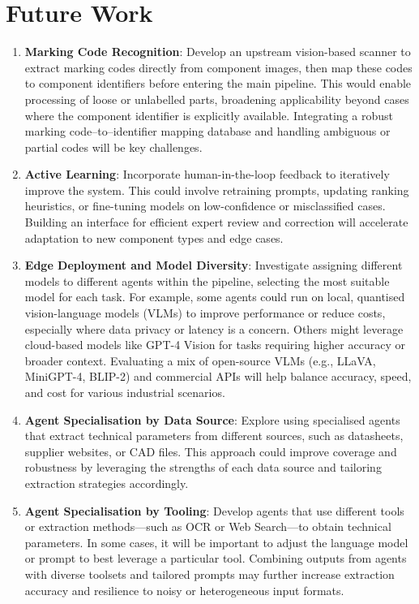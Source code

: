 \section{Future Work}
\begin{enumerate}
  \item \textbf{Marking Code Recognition}: Develop an upstream vision-based scanner to extract marking codes directly from component images, then map these codes to component identifiers before entering the main pipeline. This would enable processing of loose or unlabelled parts, broadening applicability beyond cases where the component identifier is explicitly available. Integrating a robust marking code–to–identifier mapping database and handling ambiguous or partial codes will be key challenges.
  \item \textbf{Active Learning}: Incorporate human-in-the-loop feedback to iteratively improve the system. This could involve retraining prompts, updating ranking heuristics, or fine-tuning models on low-confidence or misclassified cases. Building an interface for efficient expert review and correction will accelerate adaptation to new component types and edge cases.
  \item \textbf{Edge Deployment and Model Diversity}: Investigate assigning different models to different agents within the pipeline, selecting the most suitable model for each task. For example, some agents could run on local, quantised vision-language models (VLMs) to improve performance or reduce costs, especially where data privacy or latency is a concern. Others might leverage cloud-based models like GPT-4 Vision for tasks requiring higher accuracy or broader context. Evaluating a mix of open-source VLMs (e.g., LLaVA, MiniGPT-4, BLIP-2) and commercial APIs will help balance accuracy, speed, and cost for various industrial scenarios.
  \item \textbf{Agent Specialisation by Data Source}: Explore using specialised agents that extract technical parameters from different sources, such as datasheets, supplier websites, or CAD files. This approach could improve coverage and robustness by leveraging the strengths of each data source and tailoring extraction strategies accordingly.
  \item \textbf{Agent Specialisation by Tooling}: Develop agents that use different tools or extraction methods—such as OCR or Web Search—to obtain technical parameters. In some cases, it will be important to adjust the language model or prompt to best leverage a particular tool. Combining outputs from agents with diverse toolsets and tailored prompts may further increase extraction accuracy and resilience to noisy or heterogeneous input formats.
\end{enumerate}

